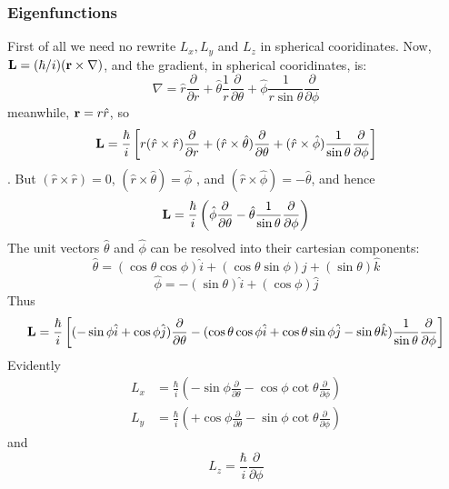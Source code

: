 \subsubsection{Eigenfunctions}\label{sec:4.3.2}
First of all we need no rewrite $L_x, L_y$ and $L_z$ in spherical cooridinates. Now, $\vb{L}=(\hbar/i)(\vb{r}\times \nabla)$, and the gradient, in spherical cooridinates, is:
\begin{equation}\label{4.123}
	\nabla=\hat{r}\frac{\partial}{\partial r}+\hat{\theta}\frac{1}{r}\frac{\partial}{\partial \theta}+\hat{\phi}\frac{1}{r\sin\theta}\frac{\partial}{\partial \phi}
\end{equation}
meanwhile, $\vb{r}=r\hat{r}$, so $$\vb{L}=\frac{\hbar}{i}\left[r(\hat{r}\times\hat{r})\frac{\partial}{\partial r}+(\hat{r}\times\hat{\theta})\frac{\partial}{\partial\theta} + (\hat{r}\times\hat{\phi})\frac{1}{\sin\theta}\frac{\partial}{\partial\phi}\right]$$. But $(\hat{r}\times\hat{r})=0$, $(\hat{r}\times\hat{\theta})=\hat{\phi}$ , and $(\hat{r}\times\hat{\phi})=-\hat{\theta}$, and hence
\begin{equation}\label{4.124}
	\vb{L}=\frac{\hbar}{i}\left(\hat{\phi}\frac{\partial}{\partial\theta}-\hat{\theta}\frac{1}{\sin\theta}\frac{\partial}{\partial\phi}\right)
\end{equation}
The unit vectors $\hat{\theta}$ and $\hat{\phi}$ can be resolved into their cartesian components:
\begin{equation}\label{4.125}
	\hat{\theta}=(\cos\theta\cos\phi)\hat{i } + (\cos\theta\sin\phi)\hat{j} + (\sin\theta)\hat{k}
\end{equation}
\begin{equation}\label{4.126}
	\hat{\phi}=-(\sin\theta)\hat{i} + (\cos\phi)\hat{j}
\end{equation}
Thus $$\vb{L} = \frac{\hbar}{i}\left[(-\sin\phi\hat{i} + \cos\phi\hat{j})\frac{\partial}{\partial\theta}-(\cos\theta\cos\phi\hat{i}+\cos\theta\sin\phi\hat{j}-\sin\theta\hat{k})\frac{1}{\sin\theta}\frac{\partial}{\partial\phi}\right]$$ Evidently
\begin{align}
	L_x&=\frac{\hbar}{i}\left(-\sin\phi\frac{\partial}{\partial\theta}-\cos\phi\cot\theta\frac{\partial}{\partial\phi}\right)\label{4.127}\\
	L_y&=\frac{\hbar}{i}\left(+\cos\phi\frac{\partial}{\partial\theta}-\sin\phi\cot\theta\frac{\partial}{\partial\phi}\right)\label{4.128}
\end{align}
and
\begin{equation}\label{4.129}
	\boxed{L_z=\frac{\hbar}{i}\frac{\partial}{\partial\phi}}
\end{equation}
